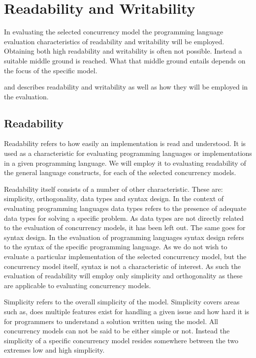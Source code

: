 \section{Readability and Writability}
In evaluating the selected concurrency model the programming language evaluation characteristics of readability and writability will be employed. Obtaining both high readability and writability is often not possible. Instead a suitable middle ground is reached. What that middle ground entails depends on the focus of the specific model.

 and  describes readability and writability as well as how they will be employed in the evaluation.

\subsection{Readability}\label{sec:readability}
Readability refers to how easily an implementation is read and understood\cite[p. 8]{sebestaProLang}. It is used as a characteristic for evaluating programming languages or implementations in a given programming language. We will employ it to evaluating readability of the general language constructs, for each of the selected concurrency models.

Readability itself consists of a number of other characteristic. These are: simplicity, orthogonality, data types and syntax design. In the context of evaluating programming languages data types refers to the presence of adequate data types for solving a specific problem. As data types are not directly related to the evaluation of concurrency models, it has been left out. The same goes for syntax design. In the evaluation of programming languages syntax design refers to the syntax of the specific programming language. As we do not wish to evaluate a particular implementation of the selected concurrency model, but the concurrency model itself, syntax is not a characteristic of interest. As such the evaluation of readability will employ only simplicity and orthogonality as these are applicable to evaluating concurrency models.

Simplicity refers to the overall simplicity of the model\cite[p. 8]{sebestaProLang}. Simplicity covers areas such as, does multiple features exist for handling a given issue and how hard it is for programmers to understand a solution written using the model. All concurrency models can not be said to be either simple or not. Instead the simplicity of a specific concurrency model resides somewhere between the two extremes low and high simplicity.  

